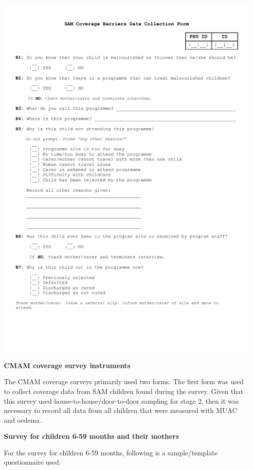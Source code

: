 \documentclass[12pt,a4paper]{article}
\begin{document}
\newpage

\begin{center}\includegraphics[width=0.9\linewidth]{forms/samBarriersForm} \end{center}

\textbf{CMAM coverage survey instruments}

The CMAM coverage surveys primarily used two forms. The first form was used to collect coverage data from SAM children found during the survey. Given that this survey used house-to-house/door-to-door sampling for stage 2, then it was necessary to record all data from all children that were measured with MUAC and oedema.

\textbf{Survey for children 6-59 months and their mothers}

For the survey for children 6-59 months, following is a sample/template questionnaire used.
\end{document}
